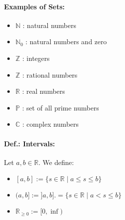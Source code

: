 \documentclass[twocolumn]{article}
\begin{document}
			\paragraph{Examples of Sets:}
				\begin{itemize}%
				\renewcommand{\labelitemi}{$\rightarrow$}
				\item $\mathbb N$ : natural numbers
				\item $\mathbb N_0$ : natural numbers and zero
				\item $\mathbb Z$ : integers
				\item $\mathbb Z$ : rational numbers
				\item $\mathbb R$ : real numbers 
				\item $\mathbb P$ : set of all prime numbers
				\item $\mathbb C$ : complex numbers
				\end{itemize}
			
			\paragraph{Def.: Intervals:}
				Let $a,b\in\mathbb R$. We define:
				\begin{itemize}%
				\renewcommand{\labelitemi}{$\rightarrow$}
				\item $[a,b]:=\{s\in\mathbb R\mid a\le s\le b\}$
				\item $(a,b]:=]a,b].=\{s\in\mathbb R\mid a<s\le b\}$ 
				\item $\mathbb R_{\ge0}:=[0,\inf)$
				\end{itemize}
\end{document}
